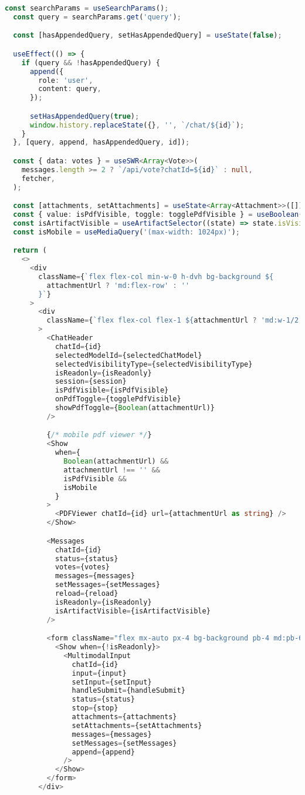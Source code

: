 \begin{lstlisting}[language=TypeScript, caption={Chat dengan AI}]
  const searchParams = useSearchParams();
  const query = searchParams.get('query');

  const [hasAppendedQuery, setHasAppendedQuery] = useState(false);

  useEffect(() => {
    if (query && !hasAppendedQuery) {
      append({
        role: 'user',
        content: query,
      });

      setHasAppendedQuery(true);
      window.history.replaceState({}, '', `/chat/${id}`);
    }
  }, [query, append, hasAppendedQuery, id]);

  const { data: votes } = useSWR<Array<Vote>>(
    messages.length >= 2 ? `/api/vote?chatId=${id}` : null,
    fetcher,
  );

  const [attachments, setAttachments] = useState<Array<Attachment>>([]);
  const { value: isPdfVisible, toggle: togglePdfVisible } = useBoolean(true);
  const isArtifactVisible = useArtifactSelector((state) => state.isVisible);
  const isMobile = useMediaQuery('(max-width: 1024px)');

  return (
    <>
      <div
        className={`flex flex-col min-w-0 h-dvh bg-background ${
          attachmentUrl ? 'md:flex-row' : ''
        }`}
      >
        <div
          className={`flex flex-col flex-1 ${attachmentUrl ? 'md:w-1/2' : 'w-full'}`}
        >
          <ChatHeader
            chatId={id}
            selectedModelId={selectedChatModel}
            selectedVisibilityType={selectedVisibilityType}
            isReadonly={isReadonly}
            session={session}
            isPdfVisible={isPdfVisible}
            onPdfToggle={togglePdfVisible}
            showPdfToggle={Boolean(attachmentUrl)}
          />

          {/* mobile pdf viewer */}
          <Show
            when={
              Boolean(attachmentUrl) &&
              attachmentUrl !== '' &&
              isPdfVisible &&
              isMobile
            }
          >
            <PDFViewer chatId={id} url={attachmentUrl as string} />
          </Show>

          <Messages
            chatId={id}
            status={status}
            votes={votes}
            messages={messages}
            setMessages={setMessages}
            reload={reload}
            isReadonly={isReadonly}
            isArtifactVisible={isArtifactVisible}
          />

          <form className="flex mx-auto px-4 bg-background pb-4 md:pb-6 gap-2 w-full md:max-w-3xl">
            <Show when={!isReadonly}>
              <MultimodalInput
                chatId={id}
                input={input}
                setInput={setInput}
                handleSubmit={handleSubmit}
                status={status}
                stop={stop}
                attachments={attachments}
                setAttachments={setAttachments}
                messages={messages}
                setMessages={setMessages}
                append={append}
              />
            </Show>
          </form>
        </div>


\end{lstlisting}
